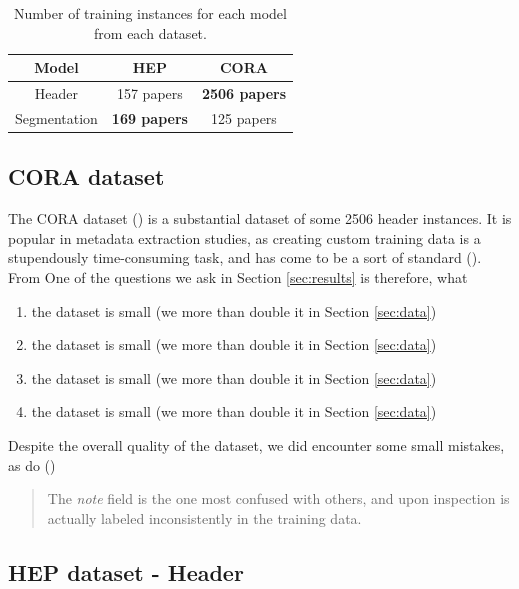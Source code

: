 \begin{table}[h]
\begin{center}
\begin{tabular}{|c|c|c|}
\hline
Model & HEP & CORA \\
\hline
Header & 157 papers & \textbf{2506 papers} \\
\hline
Segmentation & \textbf{169 papers} & 125 papers \\
\hline
\end{tabular}
\caption[Number of training instances for each model from each dataset.]{Number of training instances for each model from each dataset.}
\label{table:headervssegmentation}
\end{center}
\end{table}

\subsection{CORA dataset}
\label{subsec:cora}
The CORA dataset (\cite{mccallum2000automating}) is a substantial dataset of some 2506 header instances. It is popular in metadata extraction studies, as creating custom training data is a stupendously time-consuming task, and has come to be a sort of standard (\cite{Peng04accurateinformation}). From One of the questions we ask in Section \ref{sec:results} is therefore, what 

\begin{enumerate}
\item the dataset is small (we more than double it in Section \ref{sec:data})
\item the dataset is small (we more than double it in Section \ref{sec:data})
\item the dataset is small (we more than double it in Section \ref{sec:data})
\item the dataset is small (we more than double it in Section \ref{sec:data})
\end{enumerate}

Despite the overall quality of the dataset, we did encounter some small mistakes, as do (\cite{Peng04accurateinformation})

\blockquote{The \emph{note} field is the one most confused with others, and upon inspection is actually labeled inconsistently in the training data.}

\subsection{HEP dataset - Header}
\label{subsec:hepdatasetheader}

